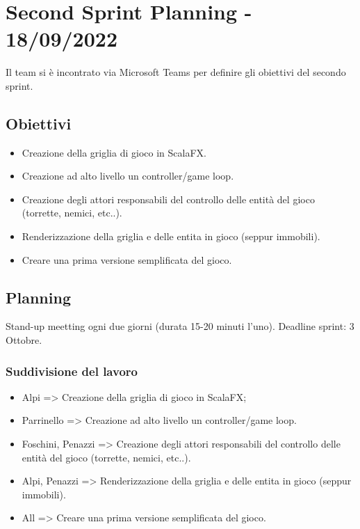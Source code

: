\section*{Second Sprint Planning - 18/09/2022}
Il team si è incontrato via Microsoft Teams per definire gli obiettivi del secondo sprint.

\subsection*{Obiettivi}
\begin{itemize}
  \item Creazione della griglia di gioco in ScalaFX.
  \item Creazione ad alto livello un controller/game loop.
  \item Creazione degli attori responsabili del controllo delle entità del gioco (torrette, nemici, etc..).
  \item Renderizzazione della griglia e delle entita in gioco (seppur immobili).
  \item Creare una prima versione semplificata del gioco.
\end{itemize}

\subsection*{Planning}
Stand-up meetting ogni due giorni (durata 15-20 minuti l'uno).
Deadline sprint: 3 Ottobre.

\subsubsection*{Suddivisione del lavoro}
\begin{itemize}
  \item Alpi => Creazione della griglia di gioco in ScalaFX;
  \item Parrinello => Creazione ad alto livello un controller/game loop.
  \item Foschini, Penazzi => Creazione degli attori responsabili del controllo delle entità del gioco (torrette, nemici, etc..).
  \item Alpi, Penazzi => Renderizzazione della griglia e delle entita in gioco (seppur immobili).
  \item All => Creare una prima versione semplificata del gioco.
\end{itemize}
